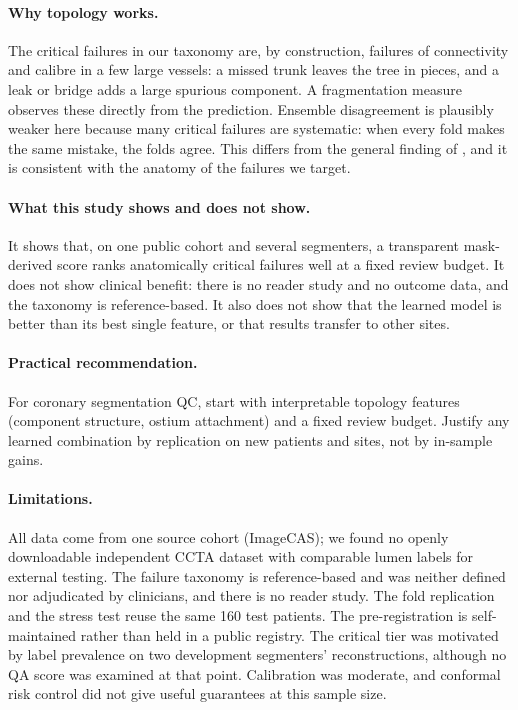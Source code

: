 \documentclass[11pt]{article}
\begin{document}
\paragraph{Why topology works.} The critical failures in our taxonomy are, by construction, failures of connectivity and calibre in a few large vessels: a missed trunk leaves the tree in pieces, and a leak or bridge adds a large spurious component. A fragmentation measure observes these directly from the prediction. Ensemble disagreement is plausibly weaker here because many critical failures are systematic: when every fold makes the same mistake, the folds agree. This differs from the general finding of \citet{zenk2025failure}, and it is consistent with the anatomy of the failures we target.

\paragraph{What this study shows and does not show.} It shows that, on one public cohort and several segmenters, a transparent mask-derived score ranks anatomically critical failures well at a fixed review budget. It does not show clinical benefit: there is no reader study and no outcome data, and the taxonomy is reference-based. It also does not show that the learned model is better than its best single feature, or that results transfer to other sites.

\paragraph{Practical recommendation.} For coronary segmentation QC, start with interpretable topology features (component structure, ostium attachment) and a fixed review budget. Justify any learned combination by replication on new patients and sites, not by in-sample gains.

\paragraph{Limitations.} All data come from one source cohort (ImageCAS); we found no openly downloadable independent CCTA dataset with comparable lumen labels for external testing. The failure taxonomy is reference-based and was neither defined nor adjudicated by clinicians, and there is no reader study. The fold replication and the stress test reuse the same 160 test patients. The pre-registration is self-maintained rather than held in a public registry. The critical tier was motivated by label prevalence on two development segmenters' reconstructions, although no QA score was examined at that point. Calibration was moderate, and conformal risk control did not give useful guarantees at this sample size.
\end{document}
